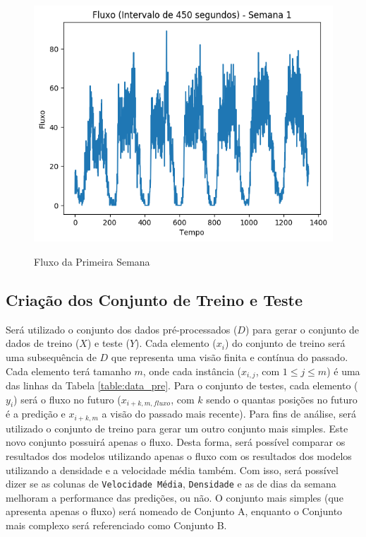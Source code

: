 \begin{figure}[H]
    \centering
    \includegraphics[scale=1]{monography/img/flows/flow_450_week_01.png}
    \label{figure:flow_discution}
    \caption[Fluxo da Primeira Semana]{Fluxo da Primeira Semana}
\end{figure}


\subsection{Criação dos Conjunto de Treino e Teste}

Será utilizado o conjunto dos dados pré-processados (\(D\)) para gerar o conjunto de dados de treino (\(X\)) e teste (\(Y\)). Cada elemento (\(x_i\)) do conjunto de treino será uma subsequência de \(D\) que representa uma visão finita e contínua do passado. Cada elemento terá tamanho \(m\), onde cada instância (\(x_{i, j}\), com \(1 \leq j \leq m \)) é uma das linhas da Tabela \ref{table:data_pre}. Para o conjunto de testes, cada elemento (\(y_i\)) será o fluxo no futuro (\(x_{i + k, m, fluxo}\), com \(k\) sendo o quantas posições no futuro é a predição e \(x_{i + k, m}\) a visão do passado mais recente). Para fins de análise, será utilizado o conjunto de treino para gerar um outro conjunto mais simples. Este novo conjunto possuirá apenas o fluxo. Desta forma, será possível comparar os resultados dos modelos utilizando apenas o fluxo com os resultados dos modelos utilizando a densidade e a velocidade média também. Com isso, será possível dizer se as colunas de \texttt{Velocidade Média}, \texttt{Densidade} e as de dias da semana melhoram a performance das predições, ou não. O conjunto mais simples (que apresenta apenas o fluxo) será nomeado de Conjunto A, enquanto o Conjunto mais complexo será referenciado como Conjunto B.

